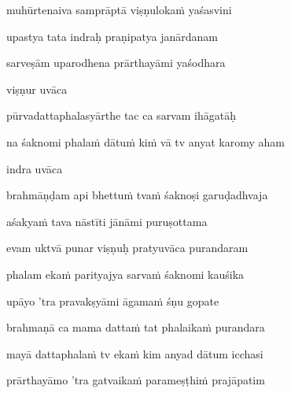 muhūrtenaiva samprāptā viṣṇulokaṁ yaśasvini \veg\dontdisplaylinenum
{}

upastya tata indraḥ praṇipatya janārdanam\thinspace{\dandab} \dontdisplaylinenum

sarveṣām uparodhena prārthayāmi yaśodhara \veg\dontdisplaylinenum
{}

viṣṇur uvāca~{\dandab}\dontdisplaylinenum 
{}

pūrvadattaphalasyārthe tac ca sarvam ihāgatāḥ\thinspace{\danda} \dontdisplaylinenum

na śaknomi phalaṁ dātuṁ kiṁ vā tv anyat karomy aham \veg\dontdisplaylinenum
{}

indra uvāca~{\dandab}\dontdisplaylinenum 

brahmāṇḍam api bhettuṁ tvaṁ śaknoṣi garuḍadhvaja\thinspace{\danda} \dontdisplaylinenum

aśakyaṁ tava nāstīti jānāmi puruṣottama \veg\dontdisplaylinenum
{}

evam uktvā punar viṣṇuḥ pratyuvāca purandaram\thinspace{\dandab} \dontdisplaylinenum

phalam ekaṁ parityajya sarvaṁ śaknomi kauśika \veg\dontdisplaylinenum
{}

upāyo 'tra pravakṣyāmi āgamaṁ śṇu gopate\thinspace{\dandab} \dontdisplaylinenum

brahmaṇā ca mama dattaṁ tat phalaikaṁ purandara \veg\dontdisplaylinenum
{}

mayā dattaphalaṁ tv ekaṁ kim anyad dātum icchasi\thinspace{\dandab} \dontdisplaylinenum

prārthayāmo 'tra gatvaikaṁ parameṣṭhiṁ prajāpatim \veg\dontdisplaylinenum 
{}

